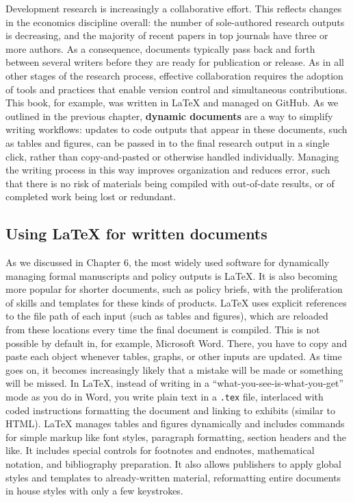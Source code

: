 Development research is increasingly a collaborative effort.
This reflects changes in the economics discipline overall:
the number of sole-authored research outputs is decreasing,
and the majority of recent papers in top journals have three or more
authors.
As a consequence, documents typically pass back and forth between several writers
before they are ready for publication or release.
As in all other stages of the research process,
effective collaboration requires the adoption of tools and practices
that enable version control and simultaneous contributions.
This book, for example, was written in {\LaTeX} and managed on GitHub.
As we outlined in the previous chapter,
\textbf{dynamic documents} are a way to simplify writing workflows:
updates to code outputs that appear in these documents, such as tables and figures,
can be passed in to the final research output in a single click,
rather than copy-and-pasted or otherwise handled individually.
Managing the writing process in this way
improves organization and reduces error,
such that there is no risk of materials being compiled
with out-of-date results, or of completed work being lost or redundant.

\subsection{Using {\LaTeX} for written documents}

As we discussed in Chapter 6, the most widely used software
for dynamically managing formal manuscripts and policy outputs is {\LaTeX}.
It is also becoming more popular for shorter documents,
such as policy briefs,
with the proliferation of skills and templates for these kinds of products.
{\LaTeX} uses explicit references to the file path of each input (such as tables and figures),
which are reloaded from these locations every time the final document is compiled.
This is not possible by default in, for example, Microsoft Word.
There, you have to copy and paste each object
whenever tables, graphs, or other inputs are updated.
As time goes on, it becomes increasingly likely
that a mistake will be made or something will be missed.
In {\LaTeX}, instead of writing in a
``what-you-see-is-what-you-get'' mode as you do in Word,
you write plain text in a \texttt{.tex} file,
interlaced with coded instructions formatting the document and linking to exhibits (similar to HTML).
{\LaTeX} manages tables and figures dynamically
and includes commands for simple markup
like font styles, paragraph formatting, section headers and the like.
It includes special controls for
footnotes and endnotes, mathematical notation, and bibliography preparation.
It also allows publishers to apply global styles and templates to already-written material,
reformatting entire documents in house styles with only a few keystrokes.

